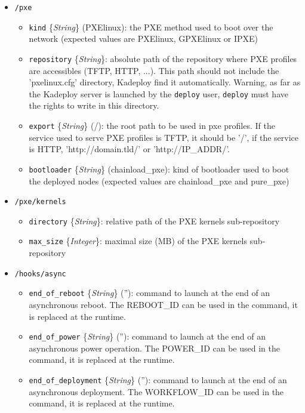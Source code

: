 \documentclass[a4wide,10pt,oneside]{book}
\newcommand{\ypath}[1]{\texttt{#1}}
\newcommand{\yfield}[2]{\texttt{#1} {\small\{{\emph{#2}}\}}:}
\newcommand{\yfieldd}[3]{\texttt{#1} {\small\{{\emph{#2}}\}} {\small(}#3{\small)}:}
\begin{document}
\begin{itemize}
  \item \ypath{/pxe}
  \begin{itemize}
    \item \yfieldd{kind}{String}{PXElinux} the PXE method used to boot over the network (expected values are PXElinux, GPXElinux or IPXE)
    \item \yfield{repository}{String} absolute path of the repository where PXE profiles are accessibles (TFTP, HTTP, ...). This path should not include the 'pxelinux.cfg' directory, Kadeploy find it automatically. Warning, as far as the Kadeploy server is launched by the \texttt{deploy} user, \texttt{deploy} must have the rights to write in this directory.
    \item \yfieldd{export}{String}{/} the root path to be used in pxe profiles. If the service used to serve PXE profiles is TFTP, it should be '/', if the service is HTTP, 'http://domain.tld/' or 'http://IP\_ADDR/'.
    \item \yfieldd{bootloader}{String}{chainload\_pxe} kind of bootloader used to boot the deployed nodes (expected values are chainload\_pxe and pure\_pxe)
  \end{itemize}

  \item \ypath{/pxe/kernels}
  \begin{itemize}
    \item \yfield{directory}{String} relative path of the PXE kernels sub-repository
    \item \yfield{max\_size}{Integer} maximal size (MB) of the PXE kernels sub-repository
  \end{itemize}

  \item \ypath{/hooks/async}
  \begin{itemize}
    \item \yfieldd{end\_of\_reboot}{String}{''} command to launch at the end of an asynchronous reboot. The REBOOT\_ID can be used in the command, it is replaced at the runtime.
    \item \yfieldd{end\_of\_power}{String}{''} command to launch at the end of an asynchronous power operation. The POWER\_ID can be used in the command, it is replaced at the runtime.
    \item \yfieldd{end\_of\_deployment}{String}{''} command to launch at the end of an asynchronous deployment. The WORKFLOW\_ID can be used in the command, it is replaced at the runtime.
  \end{itemize}


\end{itemize}
\end{document}
